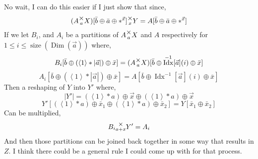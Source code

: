 \documentclass[12pt]{book}
\theoremstyle{plain}
\theoremstyle{definition}
\theoremstyle{ppart}
\theoremstyle{case}
\theoremstyle{solution}
\DeclareMathOperator{\Dim}{Dim}
\DeclareMathOperator{\Idx}{Idx}
\DeclareMathOperator{\size}{size}
\newcommand{\mmult}[1]{\text{\raisebox{1ex}{$\underset{#1}{\times}$}}}
\newcommand{\shape}[1]{\left|#1\right|}
\begin{document}
\begin{appendices}
\begin{landscape}
No wait, I can do this easier if I just show that since,
\[ (A \mmult{a} X)[\bar{b} \oplus \bar{a} \oplus *^{\vec{x}}] \mmult{x} Y = A[\bar{b} \oplus \bar{a} \oplus *^{\vec{x}}] \]
If we let $B_i$, and $A_i$ be a partitions of $A \mmult{a} X$ and $A$ respectively for $1 \le i \le \size(\Dim(\vec{a}))$
where,
\[ B_i[\bar{b} \oplus (\left<1\right>*\shape{\vec{a}}) \oplus \bar{x}] = (A \mmult{a} X)[\bar{b} \oplus \Idx^{-1}[\vec{a}](i) \oplus \bar{x}] \]
\[ A_i[\bar{b} \oplus (\left<1\right>*\shape{\vec{a}}) \oplus \bar{x}] = A[\bar{b} \oplus \Idx^{-1}[\vec{a}](i) \oplus \bar{x}] \]
Then a reshaping of $Y$ into $Y'$ where,
\[ \shape{Y'} = (\left<1\right>*a) \oplus \vec{x} \oplus (\left<1\right>*a) \oplus \vec{x} \]
\[ Y'[(\left<1\right>*a) \oplus \bar{x}_1 \oplus (\left<1\right>*a) \oplus \bar{x}_2] = Y[\bar{x}_1 \oplus \bar{x}_2] \]
Can be multiplied,
\[ B_i \mmult{a+x} Y' = A_i \]
And then those partitions can be joined back together in some way that results in $Z$. 
I think there could be a general rule I could come up with for that process.

\pagebreak



\end{landscape}
\end{appendices}
\end{document}
